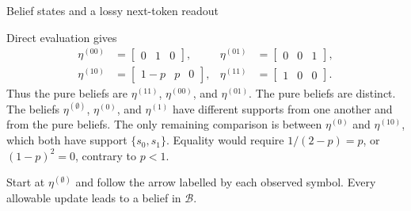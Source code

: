 \begin{exercise}[Core]{Belief states and a lossy next-token readout}
\begin{solution}
\begin{parts}
      \item Direct evaluation gives
        \[
          \begin{aligned}
            \eta^{(00)}&=\begin{bmatrix}0&1&0\end{bmatrix},&
            \eta^{(01)}&=\begin{bmatrix}0&0&1\end{bmatrix},\\
            \eta^{(10)}&=\begin{bmatrix}1-p&p&0\end{bmatrix},&
            \eta^{(11)}&=\begin{bmatrix}1&0&0\end{bmatrix}.
          \end{aligned}
        \]
        Thus the pure beliefs are $\eta^{(11)}$, $\eta^{(00)}$, and
        $\eta^{(01)}$.
        The pure beliefs are distinct. The beliefs
        $\eta^{(\emptyset)}$, $\eta^{(0)}$, and $\eta^{(1)}$ have different
        supports from one another and from the pure beliefs. The only remaining
        comparison is between $\eta^{(0)}$ and $\eta^{(10)}$, which both have
        support $\{s_0,s_1\}$. Equality would require
        $1/(2-p)=p$, or $(1-p)^2=0$, contrary to $p<1$.

        Start at $\eta^{(\emptyset)}$ and follow the arrow labelled by each
        observed symbol. Every allowable update leads to a belief in $\mathcal B$.
        \par\nobreak
        {\centering
          }
\end{parts}
\end{solution}
\end{exercise}
